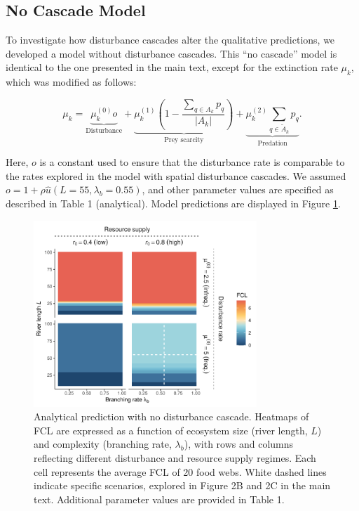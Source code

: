 \documentclass[11pt, class=article, crop=false]{standalone}
\theoremstyle{definition}
\begin{document}
\newpage

\subsection{No Cascade Model}

To investigate how disturbance cascades alter the qualitative predictions, we developed a model without disturbance cascades.
This ``no cascade'' model is identical to the one presented in the main text, except for the extinction rate $\mu_k$, which was modified as follows:

\begin{equation}
    \mu_{k} = 
        \underbrace{\mu_{k}^{(0)} o}_{\text{Disturbance}} + 
        \underbrace{\mu_{k}^{(1)} \left(1 - \frac{\sum_{q \in A_k} p_{q}}{|A_k|} \right)}_{\text{Prey scarcity}} + 
        \underbrace{\mu_{k}^{(2)} \sum_{q \in \tilde{A}_k} p_{q}}_{\text{Predation}}.
\end{equation}

Here, $o$ is a constant used to ensure that the disturbance rate is comparable to the rates explored in the model with spatial disturbance cascades.
We assumed $o = 1 + \rho \hat{u}(L = 55, \lambda_b = 0.55)$, and other parameter values are specified as described in Table 1 (analytical).
Model predictions are displayed in Figure \ref{fig:no-cascade}.

\begin{figure}
\centering
\includegraphics[width=0.75\textwidth]{../data_fmt/fig_rho0.pdf}
\caption{Analytical prediction with no disturbance cascade. Heatmaps of
FCL are expressed as a function of ecosystem size (river length, \(L\))
and complexity (branching rate, \(\lambda_b\)), with rows and columns
reflecting different disturbance and resource supply regimes. Each cell
represents the average FCL of 20 food webs. White dashed lines indicate
specific scenarios, explored in Figure 2B and 2C in the main text.
Additional parameter values are provided in Table 1.}
\label{fig:no-cascade}
\end{figure}
\end{document}
